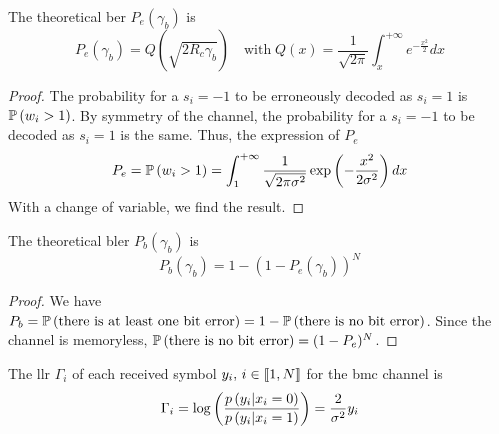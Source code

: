 \begin{iproposition}[BER]
    The theoretical \acrshort{ber} $P_e(\gamma_b)$ is
    \begin{equation}
        P_e(\gamma_b) = Q(\sqrt{2 R_c \gamma_b})
        \quad\text{with}\;
        Q(x) = \frac{1}{\sqrt{2 \pi}} \int_x^{+\infty} e^{-\frac{x^2}{2}} dx
    \end{equation}
\end{iproposition}

\begin{proof}
    The probability for a $s_i = -1$ to be erroneously decoded as $s_i = 1$ is
    $\mathbb{P}\left( w_i > 1 \right)$. By symmetry of the channel, the probability for a $s_i =
        -1$ to be decoded as $s_i = 1$ is the same. Thus, the expression of $P_e$
    \begin{equation}
        P_e = \mathbb{P}\left( w_i > 1 \right) = \int_1^{+\infty} \frac{1}{\sqrt{2 \pi \sigma^2}} \exp\left(- \frac{x^2}{2 \sigma^2}\right) dx
    \end{equation}
    With a change of variable, we find the result.
\end{proof}

\begin{iproposition}[BLER]
    The theoretical \acrshort{bler} $P_b(\gamma_b)$ is
    \begin{equation}
        P_b(\gamma_b) = 1 - (1 - P_e(\gamma_b))^N
    \end{equation}
\end{iproposition}

\begin{proof}
    We have $P_b = \mathbb{P}\left( \text{there is at least one bit error} \right) = 1 -
        \mathbb{P}\left( \text{there is no bit error} \right)$. Since the channel is memoryless,
    $\mathbb{P}\left( \text{there is no bit error} \right) = (1 - P_e)^N$.
\end{proof}

\begin{iproposition}
    The \acrfull{llr} $\Gamma_i$ of each received symbol $y_i, \, i \in {\left\llbracket 1, N \right\rrbracket}$ for
    the \acrshort{bmc} channel is
    \begin{equation}
        \Gamma_i = \log\left( \frac{p\left(y_i \middle| x_i = 0 \right)}{p\left(y_i \middle| x_i = 1 \right)} \right)
        = \frac{2}{\sigma^2} y_i
    \end{equation}
\end{iproposition}


